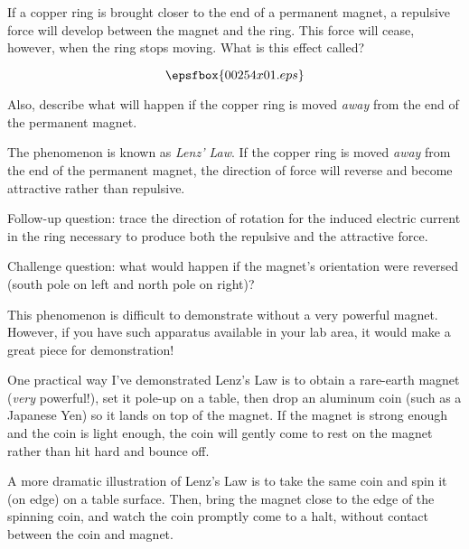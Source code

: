 

If a copper ring is brought closer to the end of a permanent magnet, a repulsive force will develop between the magnet and the ring.  This force will cease, however, when the ring stops moving.  What is this effect called?

$$\epsfbox{00254x01.eps}$$

Also, describe what will happen if the copper ring is moved {\it away} from the end of the permanent magnet.







The phenomenon is known as {\it Lenz' Law}.  If the copper ring is moved {\it away} from the end of the permanent magnet, the direction of force will reverse and become attractive rather than repulsive.


\vskip 10pt

Follow-up question: trace the direction of rotation for the induced electric current in the ring necessary to produce both the repulsive and the attractive force.

\vskip 10pt

Challenge question: what would happen if the magnet's orientation were reversed (south pole on left and north pole on right)?







This phenomenon is difficult to demonstrate without a very powerful magnet.  However, if you have such apparatus available in your lab area, it would make a great piece for demonstration!

\vskip 10pt

One practical way I've demonstrated Lenz's Law is to obtain a rare-earth magnet ({\it very} powerful!), set it pole-up on a table, then drop an aluminum coin (such as a Japanese Yen) so it lands on top of the magnet.  If the magnet is strong enough and the coin is light enough, the coin will gently come to rest on the magnet rather than hit hard and bounce off.

A more dramatic illustration of Lenz's Law is to take the same coin and spin it (on edge) on a table surface.  Then, bring the magnet close to the edge of the spinning coin, and watch the coin promptly come to a halt, without contact between the coin and magnet.

